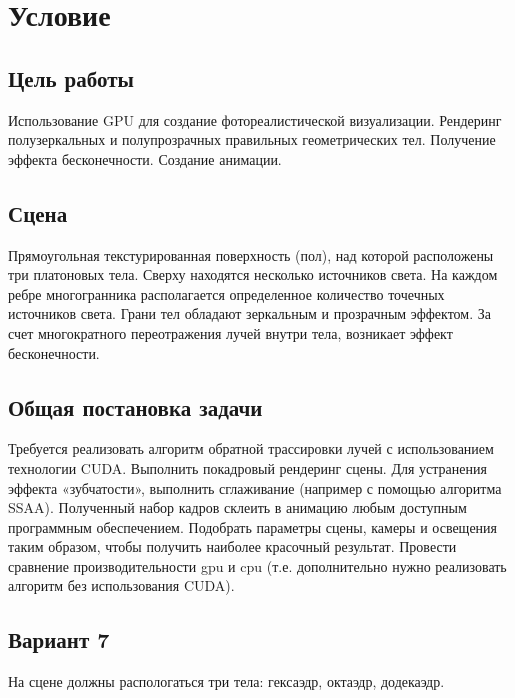 \section{Условие}
\subsection{Цель работы}
Использование GPU для создание фотореалистической визуализации. Рендеринг полузеркальных и полупрозрачных правильных геометрических тел. Получение эффекта бесконечности. Создание анимации.

\subsection{Сцена}
Прямоугольная текстурированная поверхность (пол), над которой расположены три платоновых тела. Сверху находятся несколько источников света. На каждом ребре многогранника располагается определенное количество точечных источников света. Грани тел обладают зеркальным и прозрачным эффектом. За счет многократного переотражения лучей внутри тела, возникает эффект бесконечности.

\subsection{Общая постановка задачи}
Требуется реализовать алгоритм обратной трассировки лучей с использованием технологии CUDA. Выполнить покадровый рендеринг сцены. Для устранения эффекта «зубчатости», выполнить сглаживание (например с помощью алгоритма SSAA). Полученный набор кадров склеить в анимацию любым доступным программным обеспечением. Подобрать параметры сцены, камеры и освещения таким образом, чтобы получить наиболее красочный  результат. Провести сравнение производительности gpu и cpu (т.е. дополнительно нужно реализовать алгоритм без использования CUDA).

\subsection{Вариант 7}
На сцене должны распологаться три тела: гексаэдр, октаэдр, додекаэдр.
\pagebreak
